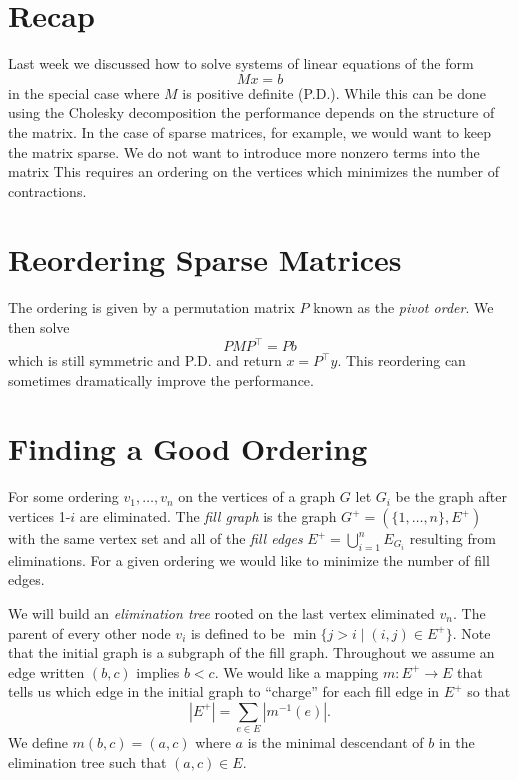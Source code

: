 \documentclass{article}
\begin{document}

\section{Recap}

Last week we discussed how to solve systems of linear equations of the form
\[ Mx = b\]
in the special case where $M$ is positive definite (P.D.).
While this can be done using the Cholesky decomposition the performance depends on the structure of the matrix.
In the case of sparse matrices, for example, we would want to keep the matrix sparse.
We do not want to introduce more nonzero terms into the matrix
This requires an ordering on the vertices which minimizes the number of contractions.

\section{Reordering Sparse Matrices}

The ordering is given by a permutation matrix $P$ known as the \emph{pivot order}.
We then solve
\[ P M P^\top = Pb \]
which is still symmetric and P.D. and return $x = P^\top y$.
This reordering can sometimes dramatically improve the performance.

\section{Finding a Good Ordering}



For some ordering $v_1,\ldots, v_n$ on the vertices of a graph $G$ let $G_i$ be the graph after vertices 1-$i$ are eliminated.
The \emph{fill graph} is the graph $G^+ = (\{1,\ldots, n\}, E^+)$ with the same vertex set and all of the \emph{fill edges} $E^+ = \bigcup_{i=1}^n E_{G_i}$ resulting from eliminations.
For a given ordering we would like to minimize the number of fill edges.

We will build an \emph{elimination tree} rooted on the last vertex eliminated $v_n$.
The parent of every other node $v_i$ is defined to be $\min\{j > i\mid (i,j)\in E^+\}$.
Note that the initial graph is a subgraph of the fill graph.
Throughout we assume an edge written $(b, c)$ implies $b < c$.
We would like a mapping $m:E^+\to E$ that tells us which edge in the initial graph to ``charge'' for each fill edge in $E^+$ so that
\[ | E^+ | = \sum_{e\in E} |m^{-1}(e)|. \]
We define $m(b, c) = (a, c)$ where $a$ is the minimal descendant of $b$ in the elimination tree such that $(a, c)\in E$.
\end{document}
